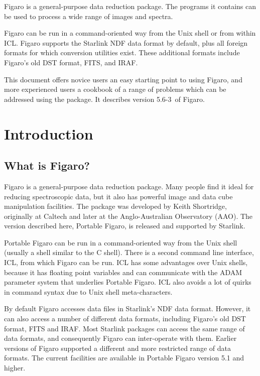 \documentclass[11pt,twoside]{article}
\makeatletter
\newcommand{\Figaroversion}{5.6-3~}
\newcommand{\stardocinitials}  {SUN}
\newcommand{\stardocnumber}    { 86.21}
\newcommand{\stardocabstract}  {
Figaro is a general-purpose data reduction package.
The programs it contains can be used to process a
wide range of images and spectra.

Figaro can be run in a command-oriented way from the
Unix shell or from within ICL\@.  Figaro supports the
Starlink NDF data format by default, plus all foreign formats
for which conversion utilities exist.
These additional formats include Figaro's old DST format, FITS, and IRAF.

This document offers novice users an easy starting
point to using Figaro, and more experienced users a
cookbook of a range of problems which can be addressed
using the package.  It describes version \Figaroversion of Figaro.
}
\newcommand{\stardocname}{\stardocinitials /\stardocnumber}
\newcommand{\htmladdnormallink}[2]{#1}
\newenvironment{latexonly}{}{}
\newcommand{\xlabel}[1]{}
\newcommand{\latexonlytoc}[0]{\tableofcontents}
\renewcommand{\thepage}{\roman{page}}
\makeatother
\begin{document}
\stardocabstract
 \newpage
 \begin{latexonly}
   \setlength{\parskip}{0mm}
   \latexonlytoc
   \setlength{\parskip}{\medskipamount}
 \end{latexonly}
\cleardoublepage
\renewcommand{\thepage}{\arabic{page}}
\setcounter{page}{1}

\section{\xlabel{introduction}\label{introduction}Introduction}
\markboth{Introduction}{\stardocname}

\subsection{\xlabel{what_is_figaro}What is Figaro?}

Figaro is a general-purpose data reduction package.
Many people find it ideal for reducing spectroscopic data, but it
also has powerful image and data cube manipulation facilities.
The package was developed by Keith Shortridge, originally at Caltech
and later at the Anglo-Australian Observatory (AAO).
The version described here, Portable Figaro, is released and supported
by \htmladdnormallink{Starlink}{http://www.starlink.ac.uk/}.

Portable Figaro can be run in a command-oriented way from the Unix
shell (usually a shell similar to the C shell).
There is a second command line interface, ICL, from which Figaro can be run.
ICL has some advantages over Unix shells, because it has floating point
variables and can communicate with the ADAM parameter system that
underlies Portable Figaro.
ICL also avoids a lot of quirks in command syntax due to Unix shell
meta-characters.

By default Figaro accesses data files in Starlink's NDF data format.
However, it can also access a number of different data formats, including
Figaro's old DST format, FITS and IRAF.
Most Starlink packages can access the same range of data formats, and
consequently Figaro can inter-operate with them.
Earlier versions of Figaro supported a different and more restricted range
of data formats.
The current facilities are available in Portable Figaro version 5.1 and
higher.
\end{document}

